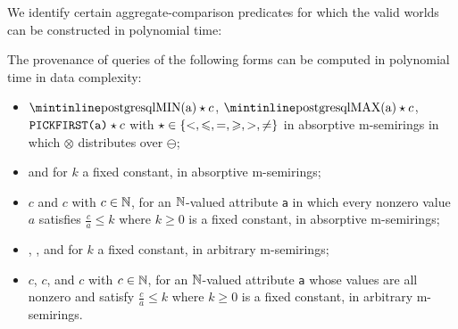 We identify certain aggregate-comparison predicates for which the valid worlds can be constructed in polynomial time:
\begin{propositionrep}
  \label{prop:algorithms}
  The provenance of  queries of the following forms can be computed
  in polynomial time in data complexity:
  \begin{itemize}
    \item $\text{\sql{MIN(a)}}\op c$,
    $\text{\sql{MAX(a)}}\op c$,
$\text{\texttt{PICKFIRST}\texttt{(a)}}\mathbin{\mathsf{\star}} c$
      with
      ${\mathbin{\mathsf{\star}}}\in\{<,\leqslant,=,\geqslant,>,\neq\}$ in absorptive m-semirings in which
      $\otimes$ distributes over $\ominus$;
    \item {} and  for $k$ a fixed constant, in absorptive
      m-semirings;
\item {}$c$ and $c$ with $c\in\mathbb{N}$, for an $\mathbb{N}$-valued
  attribute \texttt{a} in which every nonzero value $a$ satisfies
  $\frac ca\leq k$ where $k\geq 0$ is a fixed constant, in absorptive
      m-semirings;
    \item {}, , and  for $k$ a fixed
      constant, in arbitrary m-semirings;
    \item {}$c$, $c$, and $c$
      with $c\in\mathbb{N}$, for an $\mathbb{N}$-valued attribute \texttt{a} whose
      values are all nonzero and satisfy $\frac ca\leq k$ where $k\geq 0$
      is a fixed constant, in arbitrary m-semirings.
  \end{itemize}
\end{propositionrep}
